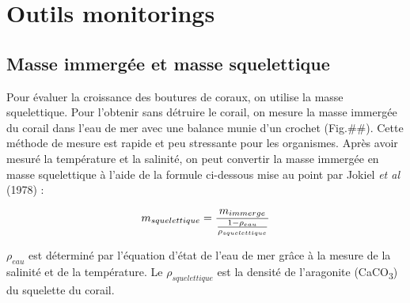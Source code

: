 \documentclass[]{report}
\begin{document}
\section{Outils monitorings}\label{outils-monitorings}

\subsection{Masse immergée et masse
squelettique}\label{masse-immergee-et-masse-squelettique}

Pour évaluer la croissance des boutures de coraux, on utilise la masse
squelettique. Pour l'obtenir sans détruire le corail, on mesure la masse
immergée du corail dans l'eau de mer avec une balance munie d'un crochet
(Fig.\#\#). Cette méthode de mesure est rapide et peu stressante pour
les organismes. Après avoir mesuré la température et la salinité, on
peut convertir la masse immergée en masse squelettique à l'aide de la
formule ci-dessous mise au point par Jokiel \emph{et al} (1978) :

\begin{equation}
\large
  m_{squelettique} = \frac {m_{immerge}}{ \frac{1 - \rho_{eau}}{ \rho_{squelettique}}}
\end{equation}

\(\rho_{eau}\) est déterminé par l'équation d'état de l'eau de mer grâce
à la mesure de la salinité et de la température. Le
\(\rho_{squelettique}\) est la densité de l'aragonite
(CaCO\textsubscript{3}) du squelette du corail.
\end{document}
